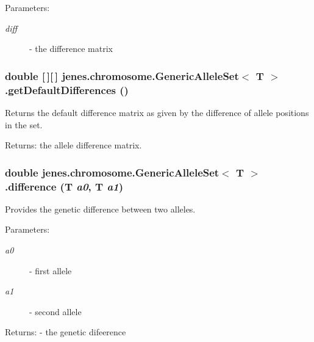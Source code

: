 \begin{Desc}
\item[Parameters:]
\begin{description}
\item[{\em diff}]- the difference matrix \end{description}
\end{Desc}
\hypertarget{classjenes_1_1chromosome_1_1_generic_allele_set_3_01_t_01_4_9c24972536c41a2d4660d9cad2694eba}{
\subsubsection[getDefaultDifferences]{\setlength{\rightskip}{0pt plus 5cm}double \mbox{[}$\,$\mbox{]}\mbox{[}$\,$\mbox{]} jenes.chromosome.GenericAlleleSet$<$ T $>$.getDefaultDifferences ()}}
\label{classjenes_1_1chromosome_1_1_generic_allele_set_3_01_t_01_4_9c24972536c41a2d4660d9cad2694eba}


Returns the default difference matrix as given by the difference of allele positions in the set. \begin{Desc}
\item[Returns:]the allele difference matrix. \end{Desc}
\hypertarget{classjenes_1_1chromosome_1_1_generic_allele_set_3_01_t_01_4_ce70b10ee535ccc3a7cbcd42739b8d5c}{
\subsubsection[difference]{\setlength{\rightskip}{0pt plus 5cm}double jenes.chromosome.GenericAlleleSet$<$ T $>$.difference (T {\em a0}, \/  T {\em a1})}}
\label{classjenes_1_1chromosome_1_1_generic_allele_set_3_01_t_01_4_ce70b10ee535ccc3a7cbcd42739b8d5c}


Provides the genetic difference between two alleles.

\begin{Desc}
\item[Parameters:]
\begin{description}
\item[{\em a0}]- first allele \item[{\em a1}]- second allele \end{description}
\end{Desc}
\begin{Desc}
\item[Returns:]- the genetic difeerence \end{Desc}


